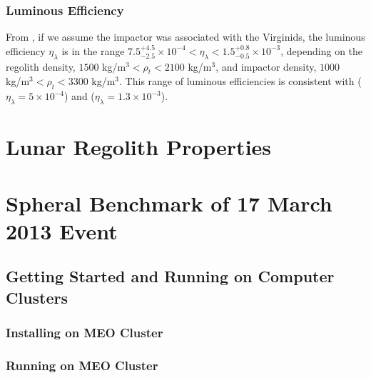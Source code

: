 \documentclass{hitec}
\begin{document}
\subsubsection{Luminous Efficiency}

From \cite{moser2014large}, if we assume the impactor was associated with the Virginids, the luminous efficiency $\eta_\lambda$ is in the range $7.5_{-2.5}^{+4.5} \times 10^{-4} < \eta_\lambda < 1.5_{-0.5}^{+0.8} \times 10^{-3}$, depending on the regolith density, $1500$ kg/m$^3 < \rho_t < 2100$ kg/m$^3$, and impactor density, $1000$ kg/m$^3 < \rho_t < 3300$ kg/m$^3$. This range of luminous efficiencies is consistent with \cite{bouley2012power} ($\eta_\lambda = 5\times 10^{-4}$) and \cite{moser2011luminous} ($\eta_\lambda = 1.3\times 10^{-3}$).

\section{Lunar Regolith Properties}



\section{Spheral Benchmark of 17 March 2013 Event}
\subsection{Getting Started and Running on Computer Clusters}
\subsubsection{Installing on MEO Cluster}



\subsubsection{Running on MEO Cluster}
\end{document}
